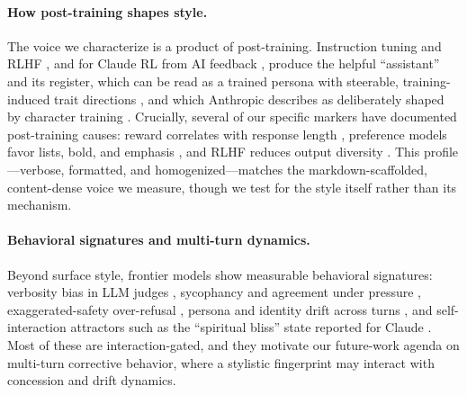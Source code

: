 \documentclass[11pt]{article}
\begin{document}
\paragraph{How post-training shapes style.}
The voice we characterize is a product of post-training. Instruction tuning and
RLHF \citep{ouyang2022instructgpt}, and for Claude RL from AI feedback
\citep{bai2022constitutional}, produce the helpful ``assistant'' and its register,
which can be read as a trained persona \citep{shanahan2023roleplay} with steerable,
training-induced trait directions \citep{chen2025personavectors}, and which
Anthropic describes as deliberately shaped by character training
\citep{anthropic2024claudecharacter}. Crucially, several of our specific markers
have documented post-training causes: reward correlates with response length
\citep{singhal2023length}, preference models favor lists, bold, and emphasis
\citep{zhang2024formatbias}, and RLHF reduces output diversity
\citep{kirk2024rlhfdiversity,padmakumar2024diversity}. This profile---verbose,
formatted, and homogenized---matches the markdown-scaffolded, content-dense voice we
measure, though we test for the style itself rather than its mechanism.

\paragraph{Behavioral signatures and multi-turn dynamics.}
Beyond surface style, frontier models show measurable behavioral signatures:
verbosity bias in LLM judges \citep{zheng2023mtbench}, sycophancy and agreement
under pressure \citep{perez2022discovering,sharma2023sycophancy,xu2023askagain},
exaggerated-safety over-refusal \citep{rottger2024xstest}, persona and identity
drift across turns \citep{li2024instability,choi2024identitydrift}, and
self-interaction attractors such as the ``spiritual bliss'' state reported for
Claude \citep{anthropic2025claude4}. Most of these are interaction-gated, and they
motivate our future-work agenda on multi-turn corrective behavior, where a
stylistic fingerprint may interact with concession and drift dynamics.
\end{document}
